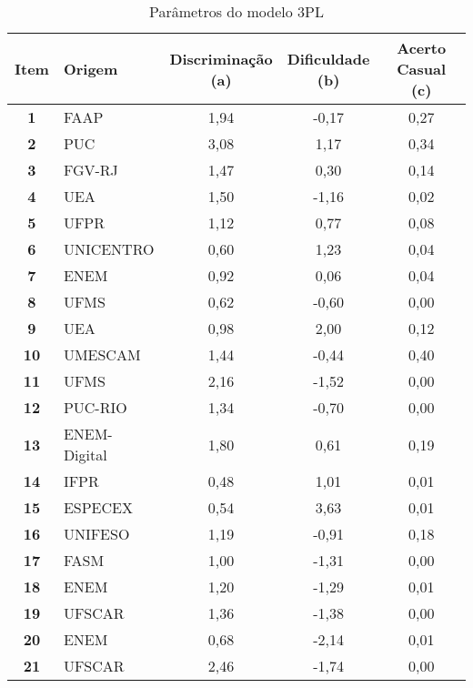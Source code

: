 \begin{table}[!htb]
	\centering
		\caption{Parâmetros do modelo 3PL}
		\label{tabela-coef3}

		\begin{tabular*}{.9\textwidth}{@{\extracolsep{\fill}}clccc@{}}
			\toprule
			\textbf{Item}  & \textbf{Origem} & 
		   \makecell{\textbf{Discriminação} \\\textbf{(a)}}& 
			\makecell{\textbf{Dificuldade} \\ \textbf{(b)}} &
			 \makecell{\textbf{Acerto Casual} \\\textbf{(c)}} 
			   \\ 
		\hline \textbf{1 }& FAAP & 1,94 & -0,17 & 0,27 \\ 
		\hline \textbf{2 }& PUC & 3,08 & 1,17 & 0,34 \\ 
		\hline \textbf{3 }& FGV-RJ & 1,47 & 0,30 & 0,14  \\ 
		\hline \textbf{4 }& UEA & 1,50 & -1,16 & 0,02  \\ 
		\hline \textbf{5 }& UFPR & 1,12 & 0,77 & 0,08 \\ 
		\hline \textbf{6 }& UNICENTRO & 0,60 & 1,23 & 0,04  \\ 
		\hline \textbf{7 }& ENEM & 0,92 & 0,06 & 0,04 \\ 
		\hline \textbf{8 }& UFMS & 0,62 & -0,60 & 0,00 \\ 
		\hline \textbf{9 }& UEA & 0,98 & 2,00 & 0,12  \\ 
		\hline \textbf{10} & UMESCAM & 1,44 & -0,44 & 0,40 \\ 
		\hline \textbf{11} & UFMS & 2,16 & -1,52 & 0,00  \\ 
		\hline \textbf{12} & PUC-RIO & 1,34 & -0,70 & 0,00 \\ 
		\hline \textbf{13} & ENEM-Digital & 1,80 & 0,61 & 0,19 \\ 
		\hline \textbf{14} & IFPR & 0,48 & 1,01 & 0,01  \\ 
		\hline \textbf{15} & ESPECEX & 0,54 & 3,63 & 0,01 \\ 
		\hline \textbf{16} & UNIFESO & 1,19 & -0,91 & 0,18  \\ 
		\hline \textbf{17} & FASM & 1,00 & -1,31 & 0,00  \\ 
		\hline \textbf{18} & ENEM & 1,20 & -1,29 & 0,01 \\ 
		\hline \textbf{19} & UFSCAR & 1,36 & -1,38 & 0,00 \\ 
		\hline \textbf{20} & ENEM & 0,68 & -2,14 & 0,01 \\ 
		\hline \textbf{21} & UFSCAR & 2,46 & -1,74 & 0,00  \\ 

\end{tabular*}
\end{table}
